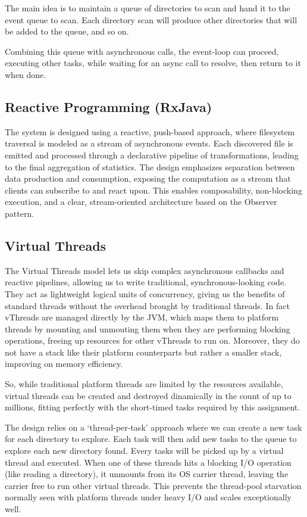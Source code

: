 \documentclass{scrartcl}
\begin{document}
The main idea is to maintain a queue of directories to scan and hand it to the event queue to scan. Each directory scan will produce other 
directories that will be added to the queue, and so on.

Combining this queue with asynchronous calls, the event-loop can proceed, executing other tasks, while waiting for an async call to resolve, then return to it when done. 

\subsection{Reactive Programming (RxJava)}
The system is designed using a reactive, push-based approach, where filesystem traversal is modeled as a stream of asynchronous events. Each discovered file is emitted and processed through a declarative pipeline of transformations, leading to the final aggregation of statistics. The design emphasizes separation between data production and consumption, exposing the computation as a stream that clients can subscribe to and react upon. This enables composability, non-blocking execution, and a clear, stream-oriented architecture based on the Observer pattern.

\subsection{Virtual Threads}\label{sec:des-vthreads}
The Virtual Threads model lets us skip complex asynchronous callbacks and reactive pipelines, allowing us to write traditional, synchronous-looking code. They act as lightweight logical units of concurrency, giving us the benefits of standard threads without the overhead brought by traditional threads.
In fact vThreads are managed directly by the JVM, which maps them to platform threads by mounting and unmouting them when they are performing blocking operations, freeing up resources for other vThreads to run on. Moreover, they do not have a stack like their platform counterparts but rather a smaller stack, improving on memory efficiency.

So, while traditional platform threads are limited by the resources available, virtual threads can be created and destroyed dinamically in the count of up to millions, fitting perfectly with the short-timed tasks required by this assignment.

The design relies on a `thread-per-task' approach where we can create a new task for each directory to explore. Each task will then add new tasks to the queue to explore each new directory found. Every tasks will be picked up by a virtual thread and executed.
When one of these threads hits a blocking I/O operation (like reading a directory), it unmounts from its OS carrier thread, leaving the carrier free to run other virtual threads. This prevents the thread-pool starvation normally seen with platform threads under heavy I/O and scales exceptionally well. 
\end{document}
